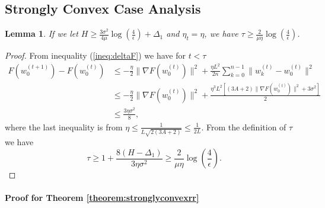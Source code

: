 \documentclass{article} %
\theoremstyle{plain}
\newtheorem{Lemma}[theorem]{Lemma}
\theoremstyle{definition}
\theoremstyle{remark}
\begin{document}
\subsection{Strongly Convex Case Analysis}
\label{stronglyproof}

\begin{Lemma}
\label{Lemma:valueofH}
    If we let $H\geq\frac{3\sigma^2}{4\mu}\log(\frac{4}{\epsilon})+\Delta_1$ and $\eta_t=\eta$, we have $\tau\geq \frac{2}{\mu\eta}\log(\frac{4}{\epsilon})$.
\end{Lemma}

\begin{proof}
    From inequality (\ref{ineq:deltaF}) we have for $t<\tau$
    \begin{align*}
        F(w^{(t+1)}_0)-F(w^{(t)}_0) & \leq -\frac{\eta}{2}\|\nabla F(w^{(t)}_0)\|^2+\frac{\eta L^2}{2n}\sum_{k=0}^{n-1} \|w^{(t)}_k-w^{(t)}_0\|^2 \\
        & \leq -\frac{\eta}{2}\|\nabla F(w^{(t)}_0)\|^2+\frac{\eta^3 L^2[(3A+2)\|\nabla F(w^{(t)}_0)\|^2+3\sigma^2]}{2} \\
        & \leq \frac{3\eta\sigma^2}{8},
    \end{align*}
    where the last inequality is from $\eta\leq \frac{1}{L\sqrt{2(3A+2)}}\leq \frac{1}{2L}$. From the definition of $\tau$ we have 
    $$\tau\geq 1+\frac{8(H-\Delta_1)}{3\eta\sigma^2}\geq \frac{2}{\mu\eta}\log(\frac{4}{\epsilon}).$$
    
\end{proof}

\paragraph{Proof for Theorem \ref{theorem:stronglyconvexrr}}
\end{document}
